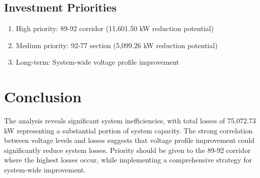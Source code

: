 \documentclass[11pt]{article}
\begin{document}
\subsection{Investment Priorities}
\begin{enumerate}
    \item High priority: 89-92 corridor (11,601.50 kW reduction potential)
    \item Medium priority: 92-77 section (5,099.26 kW reduction potential)
    \item Long-term: System-wide voltage profile improvement
\end{enumerate}

\section{Conclusion}
The analysis reveals significant system inefficiencies, with total losses of 75,072.73 kW representing a substantial portion of system capacity. The strong correlation between voltage levels and losses suggests that voltage profile improvement could significantly reduce system losses. Priority should be given to the 89-92 corridor where the highest losses occur, while implementing a comprehensive strategy for system-wide improvement.
\end{document}
